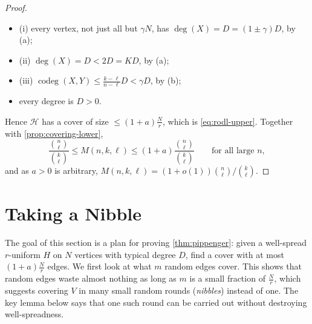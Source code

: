\begin{proof}
    \begin{itemize}
        \item (i) every vertex, not just all but \(\gamma N\), has \(\deg(X) = D = (1 \pm \gamma) D\), by (a);
        \item (ii) \(\deg(X) = D < 2D = KD\), by (a);
        \item (iii) \(\operatorname{codeg}(X,Y) \le \frac{k-\ell}{n-\ell} D < \gamma D\), by (b);
        \item every degree is \(D > 0\).
    \end{itemize}
    Hence \(\mathcal{H}\) has a cover of size \(\le (1+a)\frac{N}{r}\), which is \eqref{eq:rodl-upper}. Together with \autoref{prop:covering-lower},
    \[
        \frac{\binom{n}{\ell}}{\binom{k}{\ell}} \le M(n,k,\ell) \le (1 + a) \frac{\binom{n}{\ell}}{\binom{k}{\ell}}
        \qquad\text{for all large } n ,
    \]
    and as \(a > 0\) is arbitrary, \(M(n,k,\ell) = (1 + o(1)) \binom{n}{\ell} \big/ \binom{k}{\ell}\).
\end{proof}

\section{Taking a Nibble}\label{sec:nibble}

The goal of this section is a plan for proving \autoref{thm:pippenger}: given a well-spread \(r\)-uniform \(H\) on \(N\) vertices with typical degree \(D\), find a cover with at most \((1+a)\frac{N}{r}\) edges. We first look at what \(m\) random edges cover. This shows that random edges waste almost nothing as long as \(m\) is a small fraction of \(\frac{N}{r}\), which suggests covering \(V\) in many small random rounds (\emph{nibbles}) instead of one. The key lemma below says that one such round can be carried out without destroying well-spreadness.


